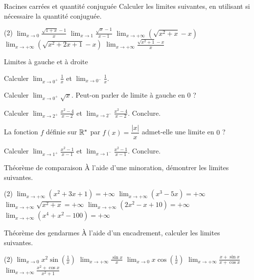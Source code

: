 \begin{exercice}[2]{Racines carrées et quantité conjuguée}
Calculer les limites suivantes, en utilisant si nécessaire la quantité conjuguée.
\begin{tasks}(2)
  \task $\displaystyle\lim_{x\to0}\frac{\sqrt{1+x}-1}{x}$
  \task $\displaystyle\lim_{x\to1}\frac{\sqrt{x}-1}{x-1}$
  \task $\displaystyle\lim_{x\to+\infty}\left(\sqrt{x^{2}+x}-x\right)$
  \task $\displaystyle\lim_{x\to+\infty}\left(\sqrt{x^{2}+2x+1}-x\right)$
  \task $\displaystyle\lim_{x\to+\infty}\frac{\sqrt{x^{2}+1}-x}{x}$
\end{tasks}
\end{exercice}

\begin{exercice}[2]{Limites à gauche et à droite}
\begin{questions}
  \item Calculer $\displaystyle\lim_{x\to0^{+}}\frac{1}{x}$ et $\displaystyle\lim_{x\to0^{-}}\frac{1}{x}$.
  \item Calculer $\displaystyle\lim_{x\to0^{+}}\sqrt{x}$. Peut-on parler de limite à gauche en $0$ ?
  \item Calculer $\displaystyle\lim_{x\to2^{+}}\frac{x^{2}-4}{x-2}$ et $\displaystyle\lim_{x\to2^{-}}\frac{x^{2}-4}{x-2}$. Conclure.
  \item La fonction $f$ définie sur $\mathbb{R}^{*}$ par $f(x)=\dfrac{|x|}{x}$ admet-elle une limite en $0$ ?
  \item Calculer $\displaystyle\lim_{x\to1^{+}}\frac{x^{2}-1}{x-1}$ et $\displaystyle\lim_{x\to1^{-}}\frac{x^{2}-1}{x-1}$. Conclure.
\end{questions}
\end{exercice}

\begin{exercice}[2]{Théorème de comparaison}
À l'aide d'une minoration, démontrer les limites suivantes.
\begin{tasks}(2)
  \task $\displaystyle\lim_{x\to+\infty}\left(x^{2}+3x+1\right)=+\infty$
  \task $\displaystyle\lim_{x\to+\infty}\left(x^{3}-5x\right)=+\infty$
  \task $\displaystyle\lim_{x\to+\infty}\sqrt{x^{2}+x}=+\infty$
  \task $\displaystyle\lim_{x\to+\infty}\left(2x^{2}-x+10\right)=+\infty$
  \task $\displaystyle\lim_{x\to+\infty}\left(x^{4}+x^{2}-100\right)=+\infty$
\end{tasks}
\end{exercice}

\begin{exercice}[2]{Théorème des gendarmes}
À l'aide d'un encadrement, calculer les limites suivantes.
\begin{tasks}(2)
  \task $\displaystyle\lim_{x\to0}x^{2}\sin\left(\frac{1}{x}\right)$
  \task $\displaystyle\lim_{x\to+\infty}\frac{\sin x}{x}$
  \task $\displaystyle\lim_{x\to0}x\cos\left(\frac{1}{x}\right)$
  \task $\displaystyle\lim_{x\to+\infty}\frac{x+\sin x}{x+\cos x}$
  \task $\displaystyle\lim_{x\to+\infty}\frac{x^{2}+\cos x}{x^{2}+1}$
\end{tasks}
\end{exercice}

